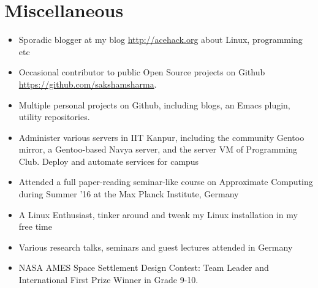 \documentclass[11pt,a4paper]{moderncv}
\begin{document}
\section*{Miscellaneous}
\begin{itemize}
  \item Sporadic blogger at my blog \url{http://acehack.org} about Linux, programming etc
  \item Occasional contributor to public Open Source projects on Github
    \url{https://github.com/sakshamsharma}.
  \item Multiple personal projects on Github, including blogs, an
    Emacs plugin, utility repositories.
  \item Administer various servers in IIT Kanpur, including the
    community Gentoo mirror, a Gentoo-based Navya server, and the
    server VM of Programming Club. Deploy and automate services for
    campus
  \item Attended a full paper-reading seminar-like course on
    Approximate Computing during Summer ’16 at the Max Planck
    Institute, Germany
  \item A Linux Enthusiast, tinker around and tweak my Linux installation in my
free time
  \item Various research talks, seminars and guest lectures attended
    in Germany
  \item NASA AMES Space Settlement Design Contest: Team Leader and International First Prize Winner in Grade 9-10.
\end{itemize}
\end{document}
